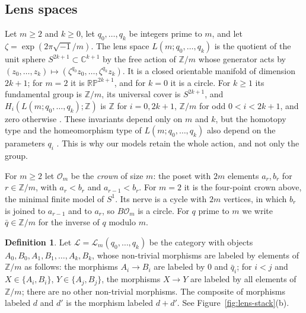 \documentclass[12pt]{amsart}
\theoremstyle{definition}
\newtheorem{definition}[teo]{Definition}
\theoremstyle{remark}
\newcommand{\Z}{\mathbb{Z}}
\newcommand{\RP}{\mathbb{RP}}
\begin{document}
\subsection{Lens spaces}\label{subsec:lens}

Let $m\ge2$ and $k\ge0$, let $q_0,\dots,q_k$ be integers prime to $m$, and let $\zeta=\exp(2\pi\sqrt{-1}/m)$. The lens space $L(m;q_0,\dots,q_k)$ is the quotient of the unit sphere $S^{2k+1}\subset\mathbb C^{k+1}$ by the free action of $\Z/m$ whose generator acts by $(z_0,\dots,z_k)\mapsto(\zeta^{q_0}z_0,\dots,\zeta^{q_k}z_k)$. It is a closed orientable manifold of dimension $2k+1$; for $m=2$ it is $\RP^{2k+1}$, and for $k=0$ it is a circle. For $k\ge1$ its fundamental group is $\Z/m$, its universal cover is $S^{2k+1}$, and $H_i(L(m;q_0,\dots,q_k);\Z)$ is $\Z$ for $i=0,2k+1$, $\Z/m$ for odd $0<i<2k+1$, and zero otherwise \cite[Example~2.43]{Hatcher2002}. These invariants depend only on $m$ and $k$, but the homotopy type and the homeomorphism type of $L(m;q_0,\dots,q_k)$ also depend on the parameters $q_i$ \cite{Whitehead1941,Reidemeister1935,Brody1960}. This is why our models retain the whole action, and not only the group.

For $m\ge2$ let $\mathcal O_m$ be the \emph{crown} of size $m$: the poset with $2m$ elements $a_r,b_r$ for $r\in\Z/m$, with $a_r<b_r$ and $a_{r-1}<b_r$. For $m=2$ it is the four-point crown above, the minimal finite model of $S^1$. Its nerve is a cycle with $2m$ vertices, in which $b_r$ is joined to $a_{r-1}$ and to $a_r$, so $B\mathcal O_m$ is a circle. For $q$ prime to $m$ we write $\bar q\in\Z/m$ for the inverse of $q$ modulo $m$.

\begin{definition}\label{def:lens}
Let $\mathcal L=\mathcal L_m(q_0,\dots,q_k)$ be the category with objects $A_0,B_0,A_1,B_1,\dots,A_k,B_k$, whose non-trivial morphisms are labeled by elements of $\Z/m$ as follows: the morphisms $A_i\to B_i$ are labeled by $0$ and $\bar q_i$; for $i<j$ and $X\in\{A_i,B_i\}$, $Y\in\{A_j,B_j\}$, the morphisms $X\to Y$ are labeled by all elements of $\Z/m$; there are no other non-trivial morphisms. The composite of morphisms labeled $d$ and $d'$ is the morphism labeled $d+d'$. See Figure~\ref{fig:lens-stack}(b).
\end{definition}
\end{document}
